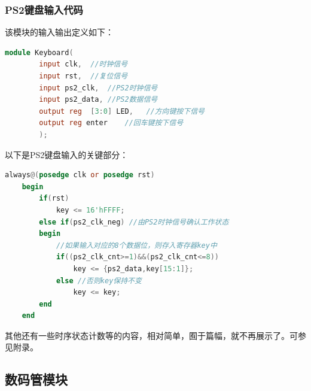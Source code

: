 \documentclass[UTF8]{article}
\begin{document}
	\subsubsection{PS2键盘输入代码}
	该模块的输入输出定义如下：\par
	\begin{lstlisting}[language=Verilog, name=PS2输入输出定义]
	module Keyboard(
		input clk,  //时钟信号
		input rst,  //复位信号
		input ps2_clk,  //PS2时钟信号
		input ps2_data, //PS2数据信号
		output reg	[3:0] LED,   //方向键按下信号
		output reg enter    //回车键按下信号
		);
	\end{lstlisting}
	以下是PS2键盘输入的关键部分：\par
	\begin{lstlisting}[language=Verilog, name=PS2输入数据关键代码]
	always@(posedge clk or posedge rst) 
	begin
		if(rst)
			key <= 16'hFFFF;
		else if(ps2_clk_neg) //由PS2时钟信号确认工作状态
		begin
			//如果输入对应的8个数据位，则存入寄存器key中
			if((ps2_clk_cnt>=1)&&(ps2_clk_cnt<=8)) 
				key <= {ps2_data,key[15:1]};   
			else //否则key保持不变
				key <= key;
		end
	end
	\end{lstlisting}
	其他还有一些时序状态计数等的内容，相对简单，囿于篇幅，就不再展示了。可参见附录。
	
	\subsection{数码管模块}
\end{document}
